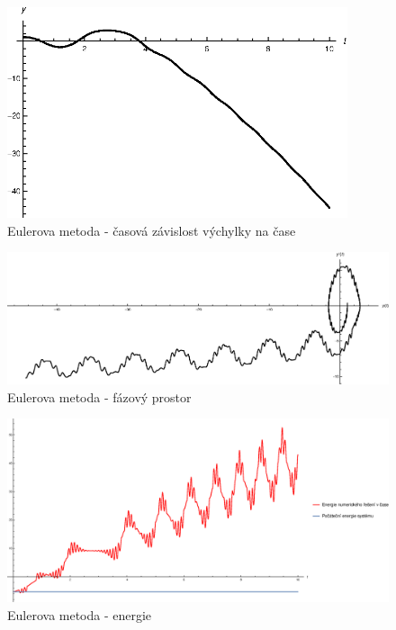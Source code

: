 {\begin{description}
\begin{figure}[h]
  \centering
  \includegraphics[width=10cm]{figures/EU1.eps}
  \caption{Eulerova metoda - časová závislost výchylky na čase}
  \label{fig:EU1}
\end{figure}

\begin{figure}[h]
  \centering
  \includegraphics[width=15cm]{figures/EU2.eps}
  \caption{Eulerova metoda - fázový prostor}
  \label{fig:EU2}
\end{figure}

\begin{figure}[h]
  \centering
  \includegraphics[width=15cm]{figures/EU3.eps}
  \caption{Eulerova metoda - energie}
  \label{fig:EU3}
\end{figure}


\end{description}}
